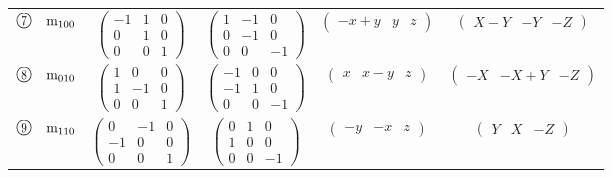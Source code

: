\documentclass[fleqn,10pt,landscape]{jsarticle}
\begin{document}
\begin{center}
\begin{longtable}{lcccc}
$ {\ooalign{\hfil\resizebox{.8\width}{\height}{7}\hfil\crcr\raise.1ex\hbox{\large$\bigcirc$}}}\quad {\rm m}_{100} $ & $ \begin{pmatrix} -1 & 1 & 0 \\ 0 & 1 & 0 \\ 0 & 0 & 1 \end{pmatrix} $ & $ \begin{pmatrix} 1 & -1 & 0 \\ 0 & -1 & 0 \\ 0 & 0 & -1 \end{pmatrix} $ & $ \begin{pmatrix} - x + y & y & z \end{pmatrix} $ & $ \begin{pmatrix} X - Y & - Y & - Z \end{pmatrix} $ \\
$ {\ooalign{\hfil\resizebox{.8\width}{\height}{8}\hfil\crcr\raise.1ex\hbox{\large$\bigcirc$}}}\quad {\rm m}_{010} $ & $ \begin{pmatrix} 1 & 0 & 0 \\ 1 & -1 & 0 \\ 0 & 0 & 1 \end{pmatrix} $ & $ \begin{pmatrix} -1 & 0 & 0 \\ -1 & 1 & 0 \\ 0 & 0 & -1 \end{pmatrix} $ & $ \begin{pmatrix} x & x - y & z \end{pmatrix} $ & $ \begin{pmatrix} - X & - X + Y & - Z \end{pmatrix} $ \\
$ {\ooalign{\hfil\resizebox{.8\width}{\height}{9}\hfil\crcr\raise.1ex\hbox{\large$\bigcirc$}}}\quad {\rm m}_{110} $ & $ \begin{pmatrix} 0 & -1 & 0 \\ -1 & 0 & 0 \\ 0 & 0 & 1 \end{pmatrix} $ & $ \begin{pmatrix} 0 & 1 & 0 \\ 1 & 0 & 0 \\ 0 & 0 & -1 \end{pmatrix} $ & $ \begin{pmatrix} - y & - x & z \end{pmatrix} $ & $ \begin{pmatrix} Y & X & - Z \end{pmatrix} $ \\

\end{longtable}
\end{center}
\end{document}
